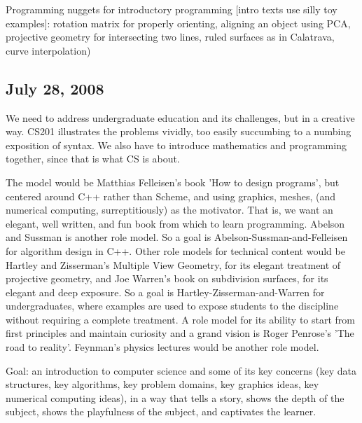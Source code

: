 \documentclass[11pt]{article}
\begin{document}
Programming nuggets for introductory programming [intro texts use silly toy examples]: 
rotation matrix for properly orienting, aligning an object using PCA, 
projective geometry for intersecting two lines, ruled surfaces as in Calatrava, curve interpolation)

\subsection{July 28, 2008}

We need to address undergraduate education and its challenges, but in a creative way.
CS201 illustrates the problems vividly, too easily succumbing to a numbing exposition of syntax.
We also have to introduce mathematics and programming together, since that is what CS is about.

The model would be Matthias Felleisen's book 'How to design programs', 
but centered around C++ rather than Scheme, and using graphics, meshes, 
(and numerical computing, surreptitiously) as the motivator.
That is, we want an elegant, well written, and fun book from which to learn programming.
Abelson and Sussman is another role model.
So a goal is Abelson-Sussman-and-Felleisen for algorithm design in C++.
Other role models for technical content would be Hartley and Zisserman's
Multiple View Geometry, for its elegant treatment of projective geometry,
and Joe Warren's book on subdivision surfaces, for its elegant and deep exposure.
So a goal is Hartley-Zisserman-and-Warren for undergraduates, where examples
are used to expose students to the discipline without requiring a complete treatment.
A role model for its ability to start from first principles and maintain curiosity
and a grand vision is Roger Penrose's 'The road to reality'.
Feynman's physics lectures would be another role model.

Goal: an introduction to computer science and some of its key concerns (key data structures,
key algorithms, key problem domains, key graphics ideas, key numerical computing ideas),
in a way that tells a story, shows the depth of the subject, shows the playfulness of the subject,
and captivates the learner.
\end{document}
